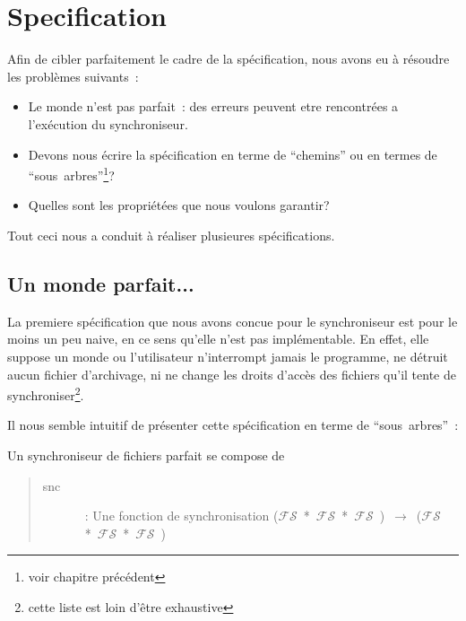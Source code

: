 \documentclass[11pt]{report}
\newcommand{\fs}{\ensuremath{\mathcal{FS}}}
\begin{document}
{\chapter{Specification}
 Afin de cibler parfaitement le cadre de la sp\'ecification, nous avons eu
\`a r\'esoudre les probl\`emes suivants~:
 \begin{itemize}
  \item Le monde n'est pas parfait~: des erreurs peuvent etre rencontr\'ees a
        l'ex\'ecution du synchroniseur.
  \item Devons nous \'ecrire la sp\'ecification en terme de ``chemins'' ou en
        termes de ``sous~arbres''\footnote{voir chapitre pr\'ec\'edent}?
  \item Quelles sont les propri\'et\'ees que nous voulons garantir?\\
\end{itemize}

Tout ceci nous a conduit \`a r\'ealiser plusieures sp\'ecifications.
\section{Un monde parfait...}
La premiere sp\'ecification que nous avons concue pour le synchroniseur est pour
le moins un peu naive, en ce sens qu'elle n'est pas impl\'ementable. En effet,
elle suppose un monde ou l'utilisateur n'interrompt jamais le programme, ne
d\'etruit aucun fichier d'archivage, ni ne change les droits d'acc\`es des
fichiers qu'il tente de synchroniser\footnote{cette liste est loin d'\^etre exhaustive}.

Il nous semble intuitif de pr\'esenter cette sp\'ecification en terme de
``sous~arbres''~:

Un synchroniseur de fichiers parfait se compose de
\begin{quote}
 \begin{description}
  \item [snc]~: Une fonction de synchronisation 
 \mbox{(\fs\ * \fs\ * \fs\ ) $\rightarrow$ (\fs\ * \fs\ * \fs\ )}
 \end{description}
\end{quote}

}
\end{document}
